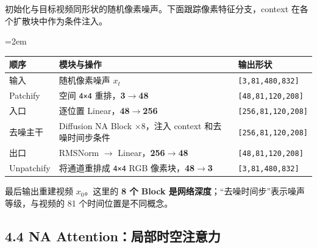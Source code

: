 \documentclass[
  11pt,
  a4paper,
  fontset=none]{ctexart}
\newcounter{none} %
\newcommand{\NotesTableStyle}{\linespread{1}\fontsize{9.5pt}{13pt}\selectfont\setlength{\tabcolsep}{4pt}\renewcommand{\arraystretch}{1.1}\setlength{\extrarowheight}{5pt}\setlength{\LTpre}{5pt}\setlength{\LTpost}{6pt}\setlength{\parskip}{0pt}\emergencystretch=2em}
\begin{document}
初始化与目标视频同形状的随机像素噪声。下面跟踪像素特征分支，context
在各个扩散块中作为条件注入。

\begingroup\NotesTableStyle\fontsize{10.5pt}{14pt}\selectfont\renewcommand{\arraystretch}{1.08}\setlength{\extrarowheight}{3pt}

{\def\LTcaptype{none} %
\begin{longtable}[]{@{}
  >{\raggedright\arraybackslash}p{}
  >{\raggedright\arraybackslash}p{}
  >{\raggedright\arraybackslash}p{}@{}}
\toprule\noalign{}
\begin{minipage}[b]{\linewidth}\raggedright
顺序
\end{minipage} & \begin{minipage}[b]{\linewidth}\raggedright
模块与操作
\end{minipage} & \begin{minipage}[b]{\linewidth}\raggedright
输出形状
\end{minipage} \\
\midrule\noalign{}
\endhead
\bottomrule\noalign{}
\endlastfoot
输入 & 随机像素噪声 \(x_t\) & \texttt{{[}3,81,480,832{]}} \\
Patchify & 空间 \texttt{4×4} 重排，\textbf{3\(\rightarrow\)48} &
\texttt{{[}48,81,120,208{]}} \\
入口 & 逐位置 Linear，\textbf{48\(\rightarrow\)256} &
\texttt{{[}256,81,120,208{]}} \\
去噪主干 & Diffusion NA Block ×8，注入 context 和去噪时间步条件 &
\texttt{{[}256,81,120,208{]}} \\
出口 & RMSNorm \(\rightarrow\) Linear，\textbf{256\(\rightarrow\)48} &
\texttt{{[}48,81,120,208{]}} \\
Unpatchify & 将通道重排成 \texttt{4×4} RGB
像素块，\textbf{48\(\rightarrow\)3} & \texttt{{[}3,81,480,832{]}} \\
\end{longtable}
}

\endgroup

最后输出重建视频 \(x_0\)。这里的 \textbf{8 个 Block
是网络深度}；``去噪时间步''表示噪声等级，与视频的 81
个时间位置是不同概念。


\subsection{4.4 NA Attention：局部时空注意力}\label{ltx25-na}
\end{document}
